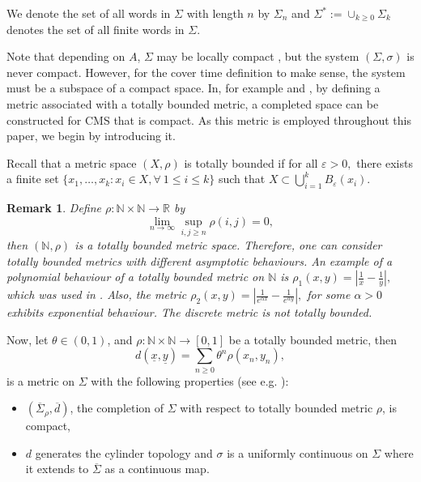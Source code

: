 \documentclass[11pt, reqno]{amsart}
\theoremstyle{plain}%
\newtheorem{remark}[theorem]{Remark}
\theoremstyle{definition}
\theoremstyle{definition}
\def\R{\ensuremath{\mathbb R}}
\def\N{\ensuremath{\mathbb N}}
\def\st{such that }
\def\ulx{\underline{x}}
\numberwithin{equation}{section}
\begin{document}
We denote the set of all words in $\Sigma$ with length $n$ by $\Sigma_n$ and $\Sigma^*:=\cup_{k\ge 0}\Sigma_k$ denotes the set of all finite words in $\Sigma$. 

Note that depending on $A$, $\Sigma$ may be locally compact \cite[Observation 7.2.3]{Kitchens}, but the system $(\Sigma,\sigma)$ is never compact. However, for the cover time definition to make sense, the system must be a subspace of a compact space. In, for example \cite{Zargar} and \cite[Section 4.1]{IommiTodd}, by defining a metric associated with a totally bounded metric, a completed space can be constructed for CMS that is compact. As this metric is employed throughout this paper, we begin by introducing it.


Recall that a metric space $(X,\rho)$ is totally bounded if for all $\varepsilon>0,$ there exists a finite set $\{x_1,\ldots,x_k: x_i\in X, \forall\ 1\le i\le k \}$ \st $X\subset\bigcup_{i=1}^k B_{\varepsilon}(x_i)$.

\begin{remark}
   Define $\rho:\N\times\N\to\R$ by $$\lim_{n\to\infty}\sup_{i,j\ge n} \rho(i,j)=0,$$ then $(\N,\rho)$ is a totally bounded metric space. Therefore, one can consider totally bounded metrics with different asymptotic behaviours. An example of a polynomial behaviour of a totally bounded metric on $\N$ is $\rho_1(x, y) = \left| \frac{1}{x} - \frac{1}{y} \right|,$ which was used in \cite{Zargar}. Also, the metric $\rho_2(x, y) = \left| \frac{1}{e^{\alpha x}} - \frac{1}{e^{\alpha y}} \right|,$ for some $\alpha>0$ exhibits exponential behaviour. The discrete metric is not totally bounded.
\end{remark}


Now, let $\theta\in(0,1)$, and $\rho:\N\times\N\to[0,1]$ be a totally bounded metric, then 
$$ d(\ulx,\underline{y})=\sum_{n\ge 0} \theta^n \rho(x_n,y_n),$$ is a metric on $\Sigma$ with the following properties (see e.g. \cite[Section 4.1]{IommiTodd}):

\begin{itemize}
    \item $(\overline{\Sigma}_\rho,\overline{d}
)$, the completion of $\Sigma$ with respect to totally bounded metric $\rho$, is compact,
    \item $d$ generates the cylinder topology and $\sigma$ is a uniformly continuous on $\Sigma$ where it extends to $\overline{\Sigma}$ as a continuous map.
\end{itemize}
\end{document}
